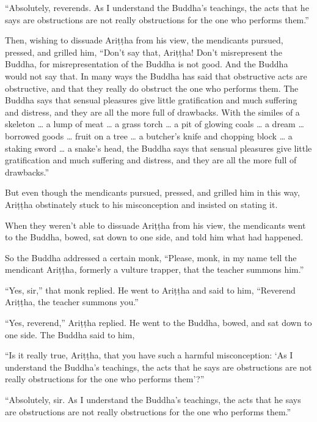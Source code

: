 \documentclass[12pt,openany]{book}%
\begin{document}
“Absolutely, reverends. As I understand the Buddha’s teachings, the acts that he says are obstructions are not really obstructions for the one who performs them.” 

Then, wishing to dissuade \textsanskrit{Ariṭṭha} from his view, the mendicants pursued, pressed, and grilled him, “Don’t say that, \textsanskrit{Ariṭṭha}! Don’t misrepresent the Buddha, for misrepresentation of the Buddha is not good. And the Buddha would not say that. In many ways the Buddha has said that obstructive acts are obstructive, and that they really do obstruct the one who performs them. The Buddha says that sensual pleasures give little gratification and much suffering and distress, and they are all the more full of drawbacks. With the similes of a skeleton … a lump of meat … a grass torch … a pit of glowing coals … a dream … borrowed goods … fruit on a tree … a butcher’s knife and chopping block … a staking sword … a snake’s head, the Buddha says that sensual pleasures give little gratification and much suffering and distress, and they are all the more full of drawbacks.” 

But even though the mendicants pursued, pressed, and grilled him in this way, \textsanskrit{Ariṭṭha} obstinately stuck to his misconception and insisted on stating it. 

When they weren’t able to dissuade \textsanskrit{Ariṭṭha} from his view, the mendicants went to the Buddha, bowed, sat down to one side, and told him what had happened. 

So the Buddha addressed a certain monk, “Please, monk, in my name tell the mendicant \textsanskrit{Ariṭṭha}, formerly a vulture trapper, that the teacher summons him.” 

“Yes, sir,” that monk replied. He went to \textsanskrit{Ariṭṭha} and said to him, “Reverend \textsanskrit{Ariṭṭha}, the teacher summons you.” 

“Yes, reverend,” \textsanskrit{Ariṭṭha} replied. He went to the Buddha, bowed, and sat down to one side. The Buddha said to him, 

“Is it really true, \textsanskrit{Ariṭṭha}, that you have such a harmful misconception: ‘As I understand the Buddha’s teachings, the acts that he says are obstructions are not really obstructions for the one who performs them’?” 

“Absolutely, sir. As I understand the Buddha’s teachings, the acts that he says are obstructions are not really obstructions for the one who performs them.” 
\end{document}
